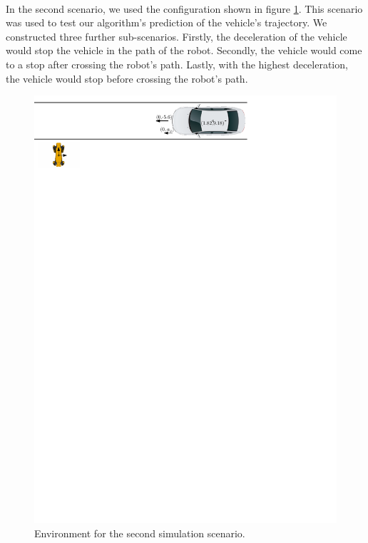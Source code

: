         \\
            In the second scenario, we used the configuration shown in figure \ref{fig:scene2}. This scenario was used to test our algorithm's prediction of the vehicle's trajectory. We constructed three further sub-scenarios. Firstly, the deceleration of the vehicle would stop the vehicle in the path of the robot. Secondly, the vehicle would come to a stop after crossing the robot's path. Lastly, with the highest deceleration, the vehicle would stop before crossing the robot's path.\\
            \begin{figure}[H]
                \centering
                \includegraphics[width=\linewidth]{images/simulations/scene2.pdf}
                \caption{Environment for the second simulation scenario.}
                \label{fig:scene2}
            \end{figure}
